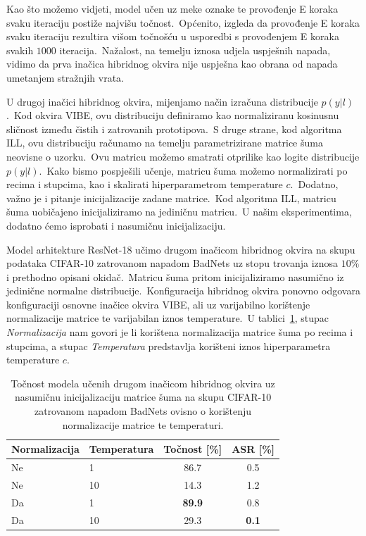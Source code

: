 \documentclass[diplomskirad]{fer}
\begin{document}
\pagebreak

Kao što možemo vidjeti, model učen uz meke oznake te provođenje E koraka svaku iteraciju postiže najvišu točnost.\ 
Općenito, izgleda da provođenje E koraka svaku iteraciju rezultira višom točnošću u usporedbi s provođenjem E koraka svakih $1000$ iteracija.\ 
Nažalost, na temelju iznosa udjela uspješnih napada, vidimo da prva inačica hibridnog okvira nije uspješna kao obrana od napada umetanjem stražnjih vrata.\ 

U drugoj inačici hibridnog okvira, mijenjamo način izračuna distribucije $p(y | l)$.\ 
Kod okvira VIBE, ovu distribuciju definiramo kao normaliziranu kosinusnu sličnost između čistih i zatrovanih prototipova.\ 
S druge strane, kod algoritma ILL, ovu distribuciju računamo na temelju parametrizirane matrice šuma neovisne o uzorku.\ Ovu matricu možemo smatrati otprilike kao logite distribucije $p(y | l)$.\ 
Kako bismo pospješili učenje, matricu šuma možemo normalizirati po recima i stupcima, kao i skalirati hiperparametrom temperature $c$.\ 
Dodatno, važno je i pitanje inicijalizacije zadane matrice.\ Kod algoritma ILL, matricu šuma uobičajeno inicijaliziramo na jediničnu matricu.\ 
U našim eksperimentima, dodatno ćemo isprobati i nasumičnu inicijalizaciju.\ 

Model arhitekture ResNet-18 učimo drugom inačicom hibridnog okvira na skupu podataka CIFAR-10 zatrovanom napadom BadNets uz stopu trovanja iznosa $10\%$ i prethodno opisani okidač.\ 
Matricu šuma pritom inicijaliziramo nasumično iz jedinične normalne distribucije.\ Konfiguracija hibridnog okvira ponovno odgovara konfiguraciji osnovne inačice okvira VIBE, ali uz varijabilno korištenje normalizacije matrice te varijabilan iznos temperature.\ 
U tablici~\ref{tbl:trovanje_hibrid2_nasumicna_init}, stupac \textit{Normalizacija} nam govori je li korištena normalizacija matrice šuma po recima i stupcima, a stupac \textit{Temperatura} predstavlja korišteni iznos hiperparametra temperature $c$.\ 

\begin{table}[htb]
  \caption{Točnost modela učenih drugom inačicom hibridnog okvira uz nasumičnu inicijalizaciju matrice šuma na skupu CIFAR-10 zatrovanom napadom BadNets ovisno o korištenju normalizacije matrice te temperaturi.}
  \label{tbl:trovanje_hibrid2_nasumicna_init}
  \centering
  \begin{tabular}{ll||cc}
  Normalizacija & Temperatura & Točnost [\%] & ASR [\%]\\ \hline \hline
  Ne & 1 & 86.7 & 0.5 \\
  Ne & 10 & 14.3 & 1.2 \\ \hline
  Da & 1 & \textbf{89.9} & 0.8 \\ 
  Da & 10 & 29.3 & \textbf{0.1} \\ 
  \end{tabular}
\end{table}
\end{document}
